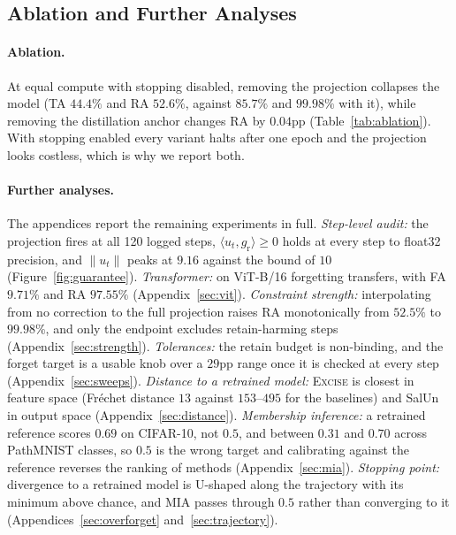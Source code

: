 \documentclass{article}
\newcommand{\ours}{\textsc{Excise}}
\newcommand{\gr}{g_{\mathrm{r}}}
\theoremstyle{remark}
\theoremstyle{plain}
\begin{document}
\subsection{Ablation and Further Analyses}\label{sec:further}

\paragraph{Ablation.}
At equal compute with stopping disabled, removing the projection collapses the
model (TA $44.4\%$ and RA $52.6\%$, against $85.7\%$ and $99.98\%$ with it),
while removing the distillation anchor changes RA by $0.04$pp
(Table~\ref{tab:ablation}). With stopping enabled every variant halts after one
epoch and the projection looks costless, which is why we report both.

\paragraph{Further analyses.}
The appendices report the remaining experiments in full. \emph{Step-level
audit:} the projection fires at all 120 logged steps, $\langle u_t,\gr\rangle \ge
0$ holds at every step to float32 precision, and $\|u_t\|$ peaks at $9.16$
against the bound of $10$ (Figure~\ref{fig:guarantee}). \emph{Transformer:} on
ViT-B/16 forgetting transfers, with FA $9.71\%$ and RA $97.55\%$
(Appendix~\ref{sec:vit}). \emph{Constraint strength:} interpolating from no
correction to the full projection raises RA monotonically from $52.5\%$ to
$99.98\%$, and only the endpoint excludes retain-harming steps
(Appendix~\ref{sec:strength}). \emph{Tolerances:} the retain budget is
non-binding, and the forget target is a usable knob over a $29$pp range once it is
checked at every step (Appendix~\ref{sec:sweeps}). \emph{Distance to a retrained
model:} \ours{} is closest in feature space (Fr\'echet distance $13$ against
$153$--$495$ for the baselines) and SalUn in output space
(Appendix~\ref{sec:distance}). \emph{Membership inference:} a retrained reference
scores $0.69$ on CIFAR-10, not $0.5$, and between $0.31$ and $0.70$ across
PathMNIST classes, so $0.5$ is the wrong target and calibrating against the
reference reverses the ranking of methods (Appendix~\ref{sec:mia}).
\emph{Stopping point:} divergence to a retrained model is U-shaped along the
trajectory with its minimum above chance, and MIA passes through $0.5$ rather
than converging to it (Appendices~\ref{sec:overforget}
and~\ref{sec:trajectory}).

\end{document}
